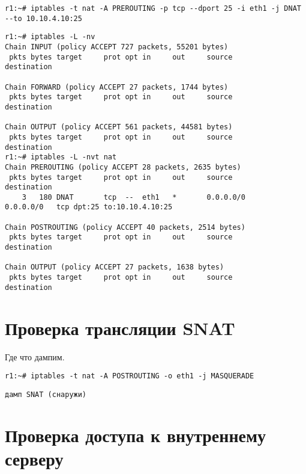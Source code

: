 \documentclass[a4paper,12pt]{article}
\begin{document}
\begin{Verbatim}
r1:~# iptables -t nat -A PREROUTING -p tcp --dport 25 -i eth1 -j DNAT --to 10.10.4.10:25
\end{Verbatim}

\begin{Verbatim}
r1:~# iptables -L -nv
Chain INPUT (policy ACCEPT 727 packets, 55201 bytes)
 pkts bytes target     prot opt in     out     source               destination         

Chain FORWARD (policy ACCEPT 27 packets, 1744 bytes)
 pkts bytes target     prot opt in     out     source               destination         

Chain OUTPUT (policy ACCEPT 561 packets, 44581 bytes)
 pkts bytes target     prot opt in     out     source               destination         
r1:~# iptables -L -nvt nat
Chain PREROUTING (policy ACCEPT 28 packets, 2635 bytes)
 pkts bytes target     prot opt in     out     source               destination         
    3   180 DNAT       tcp  --  eth1   *       0.0.0.0/0            0.0.0.0/0   tcp dpt:25 to:10.10.4.10:25 

Chain POSTROUTING (policy ACCEPT 40 packets, 2514 bytes)
 pkts bytes target     prot opt in     out     source               destination         

Chain OUTPUT (policy ACCEPT 27 packets, 1638 bytes)
 pkts bytes target     prot opt in     out     source               destination
\end{Verbatim}


\section{Проверка трансляции SNAT}

Где что дампим.

\begin{Verbatim}
r1:~# iptables -t nat -A POSTROUTING -o eth1 -j MASQUERADE
\end{Verbatim}

\begin{Verbatim}
дамп SNAT (снаружи)
\end{Verbatim}


\section{Проверка доступа к внутреннему серверу}
\end{document}
